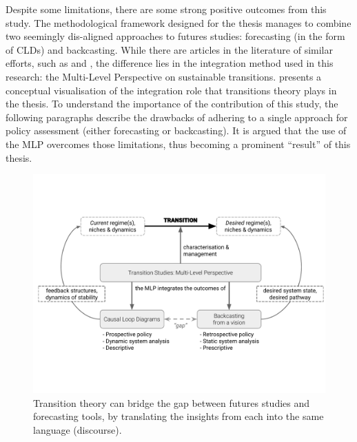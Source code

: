 Despite some limitations, there are some strong positive outcomes from this study. The methodological framework designed for the thesis manages to combine two seemingly dis-aligned approaches to futures studies: forecasting (in the form of CLDs) and backcasting. While there are articles in the literature of similar efforts, such as \textcite{kok2011_Combiningparticipativebackcasting} and \textcite{dortmans2005_Forecastingbackcastingmigration}, the difference lies in the integration method used in this research: the Multi-Level Perspective on sustainable transitions.  presents a conceptual visualisation of the integration role that transitions theory plays in the thesis. To understand the importance of the contribution of this study, the following paragraphs describe the drawbacks of adhering to a single approach for policy assessment (either forecasting or backcasting). It is argued that the use of the MLP overcomes those limitations, thus becoming a prominent ``result'' of this thesis.

\begin{figure}
\centering
\includegraphics[clip,trim=0 3cm 0 3cm,width=\linewidth]{figures/discussion-methods.pdf}
\caption[Integrative power of transition theory]{Transition theory can bridge the gap between futures studies and forecasting tools, by translating the insights from each into the same language (discourse).}
\label{f:discussion-methodology}
\end{figure}

